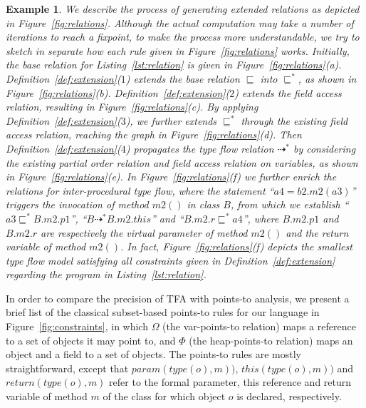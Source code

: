 \documentclass{fac}
\newtheorem{Example}{Example}
\newcommand{\VPT}{\Omega}
\newcommand{\HPT}{\Phi}
\newcommand{\less}{\sqsubseteq}
\newcommand{\tflow}{\dashrightarrow}
\begin{document}
\begin{Example}\label{ex:def2} %
We describe the process of generating extended relations as depicted in Figure~\ref{fig:relations}. Although the actual computation may take a number of iterations to reach a fixpoint, to make the process more understandable, we try to sketch in separate how each rule given in Figure~\ref{fig:relations} works. Initially, the base relation for Listing~\ref{lst:relation} is given in Figure~\ref{fig:relations}(a). Definition~\ref{def:extension}($1$) extends the base relation $\less$ into $\less^*$, as shown in Figure~\ref{fig:relations}(b). Definition~\ref{def:extension}($2$) extends the field access relation, resulting in Figure~\ref{fig:relations}(c). By applying Definition~\ref{def:extension}($3$), we further extends $\less^*$ through the existing field access relation, reaching the graph in Figure~\ref{fig:relations}(d). Then Definition~\ref{def:extension}($4$) propagates the type flow relation $\tflow^*$ by considering the existing partial order relation and field access relation on variables, as shown in Figure~\ref{fig:relations}(e). In Figure~\ref{fig:relations}(f) we further enrich the relations for inter-procedural type flow, where the statement ``$a4=b2.m2(a3)$'' triggers the invocation of method $m2()$ in class $B$, from which we establish ``$a3 \less^* B.m2.p1$'', ``$B \tflow^* B.m2.this$'' and ``$B.m2.r \less^* a4$'', where $B.m2.p1$ and $B.m2.r$ are respectively the virtual parameter of method $m2()$ and the return variable of method $m2()$. In fact, Figure~\ref{fig:relations}(f) depicts the smallest type flow model satisfying all constraints given in Definition~\ref{def:extension} regarding the program in Listing~\ref{lst:relation}.
%
\end{Example}


In order to compare the precision of TFA with points-to analysis, we present a brief list of the classical subset-based points-to rules for our language in Figure~\ref{fig:constraints}, in which $\VPT$ (the var-points-to relation) maps a reference to a set of objects it may point to, and $\HPT$ (the heap-points-to relation) maps an object and a field to a set of objects. The points-to rules are mostly straightforward, except that %
$param(type(o),m))$, $this(type(o),m))$ and $return(type(o),m)$ refer to the formal parameter, \textsf{this} reference and \textsf{return} variable of method $m$ of the class for which object $o$ is declared, respectively.
\end{document}
